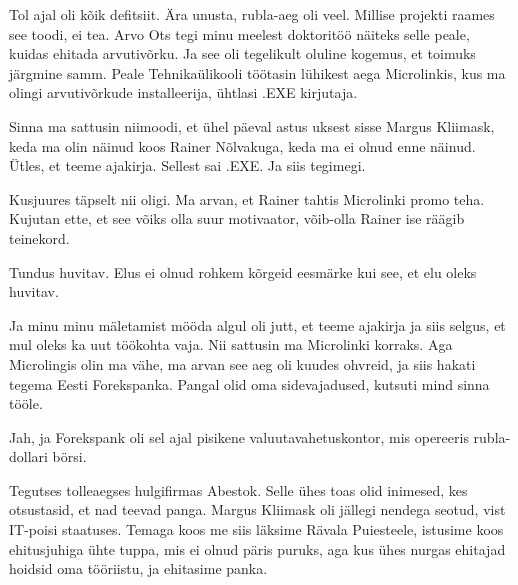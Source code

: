 
Tol ajal oli kõik defitsiit. Ära unusta, rubla-aeg oli veel. Millise projekti 
raames see toodi, ei tea. Arvo Ots tegi minu meelest 
doktoritöö näiteks selle peale, kuidas ehitada arvutivõrku. Ja see oli 
tegelikult oluline kogemus, et toimuks järgmine samm. Peale Tehnikaülikooli 
töötasin lühikest aega Microlinkis, kus ma olingi 
arvutivõrkude installeerija, ühtlasi .EXE kirjutaja.


Sinna ma sattusin niimoodi, et ühel päeval astus uksest sisse Margus 
Kliimask, keda ma olin näinud koos Rainer 
Nõlvakuga, keda ma ei olnud enne näinud. Ütles, et 
teeme ajakirja. Sellest sai .EXE. Ja siis tegimegi.


Kusjuures täpselt nii oligi. Ma arvan, et Rainer tahtis Microlinki promo teha. 
Kujutan ette, et see võiks olla suur motivaator, võib-olla Rainer ise räägib 
teinekord.


Tundus huvitav. Elus ei olnud rohkem kõrgeid eesmärke kui see, et elu oleks 
huvitav.


Ja minu minu mäletamist mööda algul oli jutt, et teeme ajakirja ja siis selgus, 
et mul oleks ka uut töökohta vaja. Nii sattusin ma Microlinki 
korraks. Aga Microlingis olin ma vähe, ma arvan see aeg oli kuudes ohvreid, ja 
siis hakati tegema Eesti Forekspanka. Pangal 
olid oma sidevajadused, kutsuti mind sinna tööle.


Jah, ja Forekspank oli sel ajal pisikene valuutavahetuskontor, mis opereeris 
rubla-dollari börsi.

Tegutses tolleaegses hulgifirmas Abestok. Selle  ühes toas olid 
inimesed, kes otsustasid, et nad teevad panga. Margus 
Kliimask oli jällegi nendega seotud, vist IT-poisi 
staatuses. Temaga koos me siis läksime Rävala Puiesteele, istusime koos 
ehitusjuhiga ühte tuppa, mis ei olnud päris puruks, aga kus ühes nurgas 
ehitajad hoidsid oma tööriistu, ja ehitasime panka.

